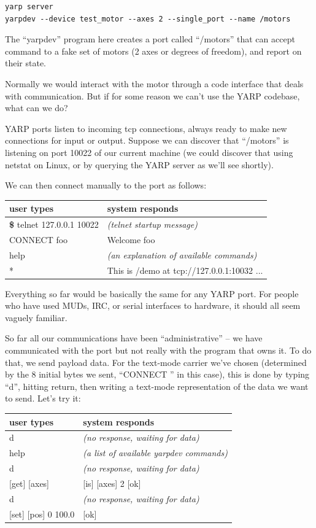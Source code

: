 \begin{verbatim}
yarp server
yarpdev --device test_motor --axes 2 --single_port --name /motors
\end{verbatim}

The ``yarpdev'' program here creates a port called ``/motors'' that can
accept command to a fake set of motors (2 axes or degrees of freedom),
and report on their state.

Normally we would interact with the motor through a code
interface that deals with communication.  But if for 
some reason we can't use the YARP codebase, what can
we do?

YARP ports listen to incoming tcp connections, always ready to make
new connections for input or output.  Suppose we can discover that
``/motors'' is listening on port 10022 of our current machine (we could
discover that using netstat on Linux, or by querying the YARP server
as we'll see shortly).

We can then connect manually to the port as follows:

\begin{center}
\begin{tabular}{ll}
\hline\hline
{\bf user types} & {\bf system responds} \\
\hline
{\bf \$} telnet 127.0.0.1 10022 & {\it (telnet startup message)} \\
CONNECT foo & Welcome foo \\
help & {\it (an explanation of available commands)} \\
* & This is /demo at tcp://127.0.0.1:10032 ... \\
\hline\hline
\end{tabular}
\end{center}

Everything so far would be basically the same for any YARP port.
For people who have used MUDs, IRC, or serial interfaces to hardware,
it should all seem vaguely familiar.

So far all our communications have been ``administrative'' --
we have communicated with the port but not really with the 
program that owns it.  To do that, we send payload data.  For the
text-mode carrier we've chosen (determined by the 8 initial
bytes we sent, ``CONNECT '' in this case), this is done by typing
``d'', hitting return, then writing a text-mode representation of
the data we want to send.  Let's try it:

\begin{center}
\begin{tabular}{ll}
\hline\hline
{\bf user types} & {\bf system responds} \\
\hline
 d & {\it (no response, waiting for data)} \\
 help & {\it (a list of available yarpdev commands)} \\
 d & {\it (no response, waiting for data)} \\
 {[get] [axes]} &  {[is] [axes] 2 [ok]} \\
 d & {\it (no response, waiting for data)} \\
 {[set] [pos] 0 100.0} & {[ok]} \\
\hline\hline
\end{tabular}
\end{center}

